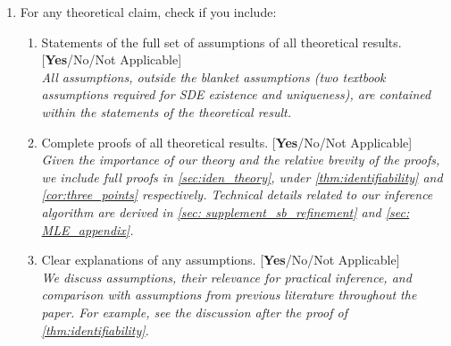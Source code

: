 \documentclass[twoside]{article}
\begin{document}
\begin{enumerate}
  \item For any theoretical claim, check if you include:
  \begin{enumerate}
    \item Statements of the full set of assumptions of all theoretical results. [\textbf{Yes}/No/Not Applicable]\\
    \textit{All assumptions, outside the blanket assumptions (two textbook assumptions required for SDE existence and uniqueness), are contained within the statements of the theoretical result.}
    \item Complete proofs of all theoretical results. [\textbf{Yes}/No/Not Applicable]\\
    \textit{Given the importance of our theory and the relative brevity of the proofs, we include full proofs in \cref{sec:iden_theory}, under \cref{thm:identifiability} and \cref{cor:three_points} respectively. Technical details related to our inference algorithm are derived in \cref{sec: supplement_sb_refinement} and \cref{sec: MLE_appendix}.}
    \item Clear explanations of any assumptions. [\textbf{Yes}/No/Not Applicable]\\
    \textit{We discuss assumptions, their relevance for practical inference, and comparison with assumptions from previous literature throughout the paper. For example, see the discussion after the proof of \cref{thm:identifiability}. }
  \end{enumerate}


\end{enumerate}
\end{document}

